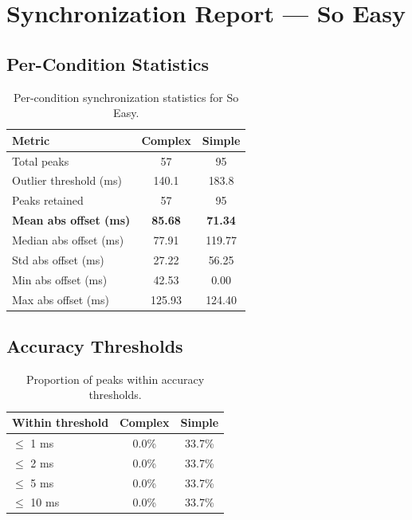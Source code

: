 
\section*{Synchronization Report --- So Easy}

\subsection*{Per-Condition Statistics}

\begin{table}[h!]
\centering
\begin{tabular}{|l|c|c|}
\hline
Metric & Complex & Simple \\
\hline
Total peaks & 57 & 95 \\
Outlier threshold (ms) & 140.1 & 183.8 \\
Peaks retained & 57 & 95 \\
\textbf{Mean abs offset (ms)} & \textbf{85.68} & \textbf{71.34} \\
Median abs offset (ms) & 77.91 & 119.77 \\
Std abs offset (ms) & 27.22 & 56.25 \\
Min abs offset (ms) & 42.53 & 0.00 \\
Max abs offset (ms) & 125.93 & 124.40 \\
\hline
\end{tabular}
\caption{Per-condition synchronization statistics for So Easy.}
\label{tab:sync_stats}
\end{table}

\subsection*{Accuracy Thresholds}

\begin{table}[h!]
\centering
\begin{tabular}{|l|c|c|}
\hline
Within threshold & Complex & Simple \\
\hline
$\leq$ 1 ms & 0.0\% & 33.7\% \\
$\leq$ 2 ms & 0.0\% & 33.7\% \\
$\leq$ 5 ms & 0.0\% & 33.7\% \\
$\leq$ 10 ms & 0.0\% & 33.7\% \\
\hline
\end{tabular}
\caption{Proportion of peaks within accuracy thresholds.}
\label{tab:sync_accuracy}
\end{table}

